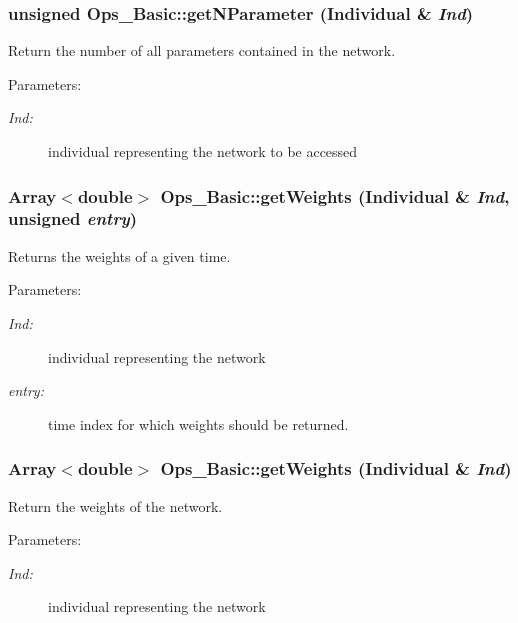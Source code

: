 \subsubsection{\setlength{\rightskip}{0pt plus 5cm}unsigned Ops\_\-Basic::get\-NParameter (Individual \& {\em Ind})}\label{classOps__Basic_a10}


Return the number of all parameters contained in the network.

\begin{Desc}
\item[Parameters: ]\par
\begin{description}
\item[{\em 
Ind:}]individual representing the network to be accessed \end{description}
\end{Desc}
\subsubsection{\setlength{\rightskip}{0pt plus 5cm}Array$<$double$>$ Ops\_\-Basic::get\-Weights (Individual \& {\em Ind}, unsigned {\em entry})}\label{classOps__Basic_a5}


Returns the weights of a given time.

\begin{Desc}
\item[Parameters: ]\par
\begin{description}
\item[{\em 
Ind:}]individual representing the network \item[{\em 
entry:}]time index for which weights should be returned. \end{description}
\end{Desc}
\subsubsection{\setlength{\rightskip}{0pt plus 5cm}Array$<$double$>$ Ops\_\-Basic::get\-Weights (Individual \& {\em Ind})}\label{classOps__Basic_a4}


Return the weights of the network.

\begin{Desc}
\item[Parameters: ]\par
\begin{description}
\item[{\em 
Ind:}]individual representing the network \end{description}
\end{Desc}
